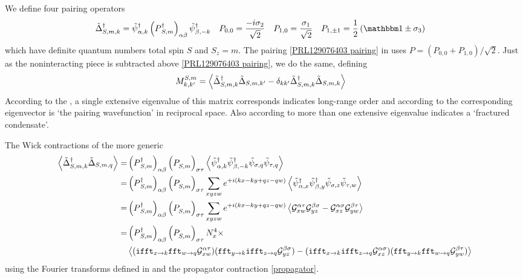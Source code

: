 We define four pairing operators
\begin{align}
    \tilde{\Delta}\adjoint_{S,m,k} &= \tilde{\psi}\adjoint_{\alpha,k} \left(P\adjoint_{S,m}\right)_{\alpha\beta} \tilde{\psi}\adjoint_{\beta,-k}
    &
    P_{0,0} &= \frac{-i \sigma_2}{\sqrt{2}}
    &
    P_{1,0} &= \frac{\sigma_1}{\sqrt{2}}
    &
    P_{1,\pm1} &= \oneover{2}\left( \one \pm \sigma_3 \right)
\end{align}
which have definite quantum numbers total spin $S$ and $S_z=m$.
The pairing \eqref{PRL129076403 pairing} in  uses $P = (P_{0,0} + P_{1,0})/\sqrt{2}$.
Just as the noninteracting piece is subtracted above \eqref{PRL129076403 pairing}, we do the same, defining
\begin{align}
    M^{S,m}_{k,k'} &= \left\langle  \tilde{\Delta}{}^{\dagger}_{S,m,k} \tilde{\Delta}_{S,m,k'} - \delta_{kk'} \tilde{\Delta}{}^{\dagger}_{S,m,k} \tilde{\Delta}_{S,m,k} \right\rangle
\end{align}
According to the , a single extensive eigenvalue of this matrix corresponds indicates long-range order and according to  the corresponding eigenvector is `the pairing wavefunction' in reciprocal space.
Also according to  more than one extensive eigenvalue indicates a `fractured condensate'.

The Wick contractions of the more generic
\begin{align}
    \left\langle  \tilde{\Delta}{}^{\dagger}_{S,m,k} \tilde{\Delta}_{S,m,q}  \right\rangle
    =&
    \left(P{}^{\dagger}_{S,m}\right)_{\alpha\beta} \left(P^{\phantom{\dagger}}_{S,m}\right)_{\sigma\tau} \left\langle  
        \tilde{\psi}{}^{\dagger}_{\alpha,k} \tilde{\psi}{}^{\dagger}_{\beta,-k}
        \tilde{\psi}_{\sigma,q} \tilde{\psi}_{\tau,q}  \right\rangle
    \nonumber\\
    =&
    \left(P{}^{\dagger}_{S,m}\right)_{\alpha\beta} \left(P^{\phantom{\dagger}}_{S,m}\right)_{\sigma\tau}
    \sum_{xyzw} e^{+i(kx-ky+qz-qw)}
    \left\langle  
        \tilde{\psi}{}^{\dagger}_{\alpha,x} \tilde{\psi}{}^{\dagger}_{\beta,y}
        \tilde{\psi}_{\sigma,z} \tilde{\psi}_{\tau,w}
         \right\rangle
    \nonumber\\
    =&
    \left(P{}^{\dagger}_{S,m}\right)_{\alpha\beta} \left(P^{\phantom{\dagger}}_{S,m}\right)_{\sigma\tau}
    \sum_{xyzw} e^{+i(kx-ky+qz-qw)}
    \left\langle  
            \mathcal{G}^{\alpha\tau}_{xw} \mathcal{G}^{\beta\sigma}_{yz}
        -   \mathcal{G}^{\alpha\sigma}_{xz} \mathcal{G}^{\beta\tau}_{yw}
         \right\rangle
    \nonumber\\
    =&
    \left(P{}^{\dagger}_{S,m}\right)_{\alpha\beta} \left(P^{\phantom{\dagger}}_{S,m}\right)_{\sigma\tau}
    N_x^4 \times
    \\
    &
    \left\langle  
            (\texttt{ifft}_{x \rightarrow k} \texttt{fft}_{w \rightarrow q}\mathcal{G}^{\alpha\tau}_{xw})
            (\texttt{fft}_{y \rightarrow k} \texttt{ifft}_{z \rightarrow q}\mathcal{G}^{\beta\sigma}_{yz})
        -   (\texttt{ifft}_{x \rightarrow k} \texttt{ifft}_{z \rightarrow q}\mathcal{G}^{\alpha\sigma}_{xz})
            (\texttt{fft}_{y \rightarrow k} \texttt{fft}_{w \rightarrow q} \mathcal{G}^{\beta\tau}_{yw})
         \right\rangle
    \nonumber
\end{align}
using the Fourier transforms defined in  and the propagator contraction \eqref{propagator}.
